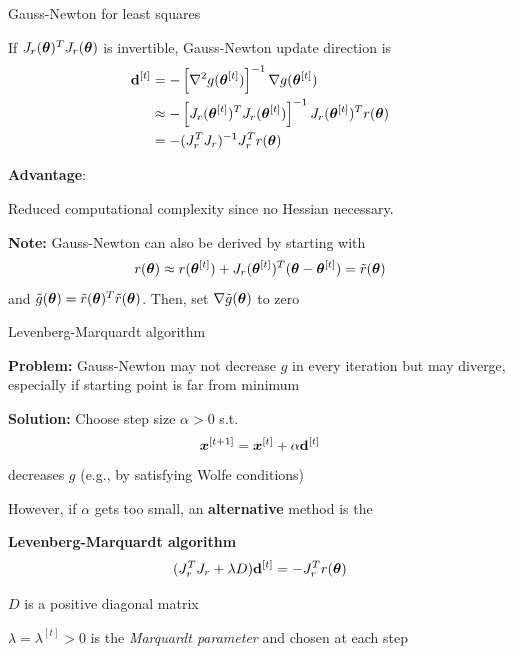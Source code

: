 \documentclass[11pt,compress,t,notes=noshow, xcolor=table]{beamer}
\begin{document}
\begin{framei}{Gauss-Newton for least squares}
\item If $J_r(\bm{\theta})^T J_r(\bm{\theta})$ is invertible, Gauss-Newton update direction is
$$
\begin{aligned}
\mathbf{d}^{[t]} &= - \left[\nabla^2 g(\bm{\theta}^{[t]})\right]^{-1} \nabla g(\bm{\theta}^{[t]}) \\
&\approx - \left[J_r(\bm{\theta}^{[t]})^T J_r(\bm{\theta}^{[t]})\right]^{-1} J_r(\bm{\theta}^{[t]})^T r(\bm{\theta}) \\
&= - (J_r^T J_r)^{-1} J_r^T r(\bm{\theta})
\end{aligned}
$$
\vfill
\item \textbf{Advantage}:
\begin{center}
Reduced computational complexity since no Hessian necessary.
\end{center}
\vfill
\item \textbf{Note:} Gauss-Newton can also be derived by starting with
$$
r(\bm{\theta}) \approx r(\bm{\theta}^{[t]}) + J_r(\bm{\theta}^{[t]})^T (\bm{\theta} - \bm{\theta}^{[t]}) = \tilde{r}(\bm{\theta})
$$
and $\tilde{g}(\bm{\theta}) = \tilde{r}(\bm{\theta})^T \tilde{r}(\bm{\theta})$.
Then, set $\nabla \tilde{g}(\bm{\theta})$ to zero
\end{framei}


\begin{framei}{Levenberg-Marquardt algorithm}
\item \textbf{Problem:} Gauss-Newton may not decrease $g$ in every iteration but may diverge, especially if starting point is far from minimum
\item \textbf{Solution:} Choose step size $\alpha > 0$ s.t.
$$
\bm{x}^{[t+1]} = \bm{x}^{[t]} + \alpha \mathbf{d}^{[t]}
$$
decreases $g$ (e.g., by satisfying Wolfe conditions)
\item However, if $\alpha$ gets too small, an \textbf{alternative} method is the
\begin{center}
\textbf{Levenberg-Marquardt algorithm}
$$
(J_r^T J_r + \lambda D) \mathbf{d}^{[t]} = -J_r^T r(\bm{\theta})
$$
\end{center}
\item $D$ is a positive diagonal matrix
\item $\lambda = \lambda^{[t]} > 0$ is the \emph{Marquardt parameter} and chosen at each step
\end{framei}
\end{document}
